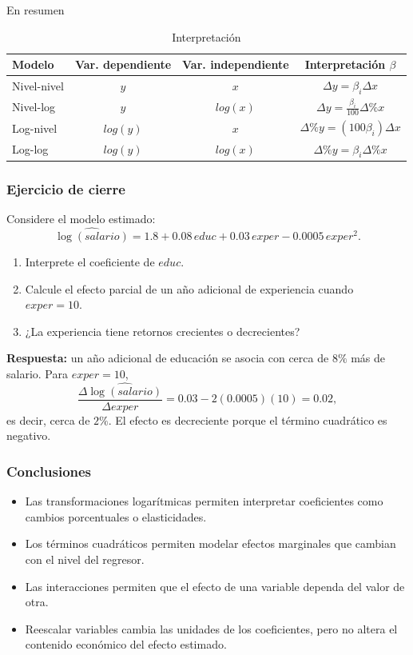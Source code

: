 \documentclass{beamer}
\begin{document}
\begin{frame}{En resumen}

\begin{table}[]
    \centering
    \begin{tabular}{l|c|c|c}
       Modelo  & Var. dependiente & Var. independiente & Interpretación $\beta$ \\ \hline 
       Nivel-nivel  & $y$ & $x$ & $\Delta y = \beta_i \Delta x$\\
       Nivel-log  & $y$ & $log(x)$ & $\Delta y = \frac{\beta_i}{100} \Delta \% x$ \\
       Log-nivel  & $log(y)$ & $x$ & $ \Delta\% y = (100 \beta_i) \Delta x$\\
       Log-log  & $log(y)$ & $log(x)$ & $ \Delta \% y = \beta_i \Delta \%x$\\
    \end{tabular}
    \caption{Interpretación}
    \label{tab:my_label}
\end{table}

\end{frame}

\begin{frame}
\frametitle{Ejercicio de cierre}

Considere el modelo estimado:
\[
\widehat{\log(salario)}=1.8+0.08\,educ+0.03\,exper-0.0005\,exper^2.
\]

\begin{enumerate}
    \item Interprete el coeficiente de \(educ\).
    \item Calcule el efecto parcial de un año adicional de experiencia cuando \(exper=10\).
    \item ¿La experiencia tiene retornos crecientes o decrecientes?
\end{enumerate}

\vspace{0.2cm}
\textbf{Respuesta:} un año adicional de educación se asocia con cerca de \(8\%\) más de salario. Para \(exper=10\),
\[
\frac{\Delta \widehat{\log(salario)}}{\Delta exper}=0.03-2(0.0005)(10)=0.02,
\]
es decir, cerca de \(2\%\). El efecto es decreciente porque el término cuadrático es negativo.

\end{frame}

\begin{frame}
\frametitle{Conclusiones}
\begin{itemize}
    \item Las transformaciones logarítmicas permiten interpretar coeficientes como cambios porcentuales o elasticidades.
    \item Los términos cuadráticos permiten modelar efectos marginales que cambian con el nivel del regresor.
    \item Las interacciones permiten que el efecto de una variable dependa del valor de otra.
    \item Reescalar variables cambia las unidades de los coeficientes, pero no altera el contenido económico del efecto estimado.
\end{itemize}
\end{frame}
\end{document}
